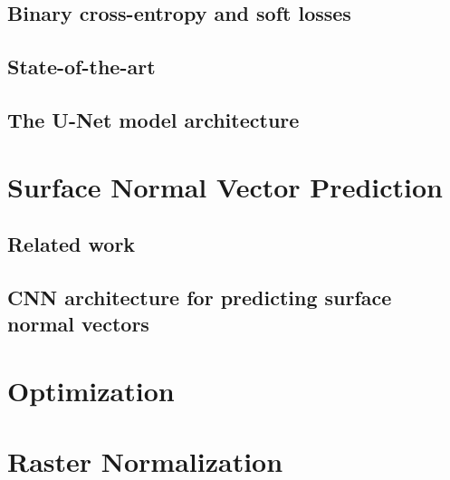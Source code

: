 \subsection{Binary cross-entropy and soft losses}

\subsection{State-of-the-art}%
\label{sec:segmentation-state-of-the-art}

\subsection{The U-Net model architecture}%
\label{sec:unet}

\clearpage

\section{Surface Normal Vector Prediction}\label{sec:surface-raster-model}

\subsection{Related work}\label{sec:normal-vector-literature}

\subsection{CNN architecture for predicting surface normal vectors}%
\label{sec:normal-model}


\section{Optimization}\label{sec:optimization}


\section{Raster Normalization}%
\label{sec:raster-normalization}

